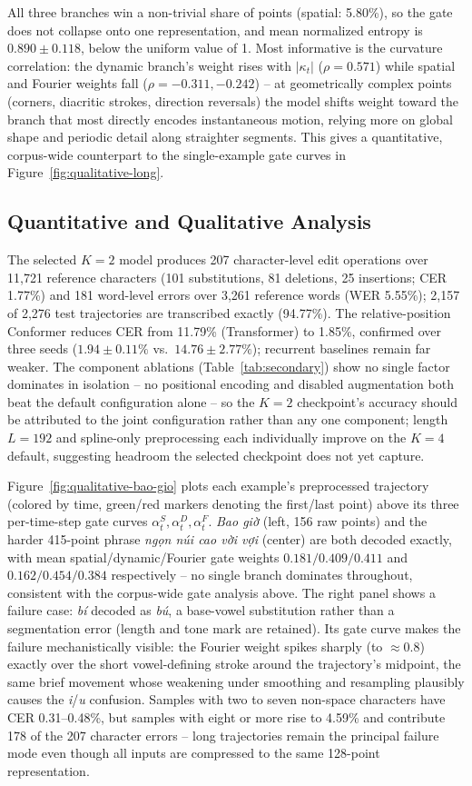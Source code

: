 \documentclass[runningheads]{llncs}
\begin{document}
All three branches win a non-trivial share of points (spatial: 5.80\%), so the gate does not collapse onto one representation, and mean normalized entropy is $0.890\pm0.118$, below the uniform value of 1. Most informative is the curvature correlation: the dynamic branch's weight rises with $|\kappa_t|$ ($\rho=0.571$) while spatial and Fourier weights fall ($\rho=-0.311,-0.242$) -- at geometrically complex points (corners, diacritic strokes, direction reversals) the model shifts weight toward the branch that most directly encodes instantaneous motion, relying more on global shape and periodic detail along straighter segments. This gives a quantitative, corpus-wide counterpart to the single-example gate curves in Figure~\ref{fig:qualitative-long}.

\subsection{Quantitative and Qualitative Analysis}
The selected $K=2$ model produces 207 character-level edit operations over 11,721 reference characters (101 substitutions, 81 deletions, 25 insertions; CER 1.77\%) and 181 word-level errors over 3,261 reference words (WER 5.55\%); 2,157 of 2,276 test trajectories are transcribed exactly (94.77\%). The relative-position Conformer reduces CER from 11.79\% (Transformer) to 1.85\%, confirmed over three seeds ($1.94\pm0.11\%$ vs.\ $14.76\pm2.77\%$); recurrent baselines remain far weaker. The component ablations (Table~\ref{tab:secondary}) show no single factor dominates in isolation -- no positional encoding and disabled augmentation both beat the default configuration alone -- so the $K=2$ checkpoint's accuracy should be attributed to the joint configuration rather than any one component; length $L=192$ and spline-only preprocessing each individually improve on the $K=4$ default, suggesting headroom the selected checkpoint does not yet capture.

Figure~\ref{fig:qualitative-bao-gio} plots each example's preprocessed trajectory (colored by time, green/red markers denoting the first/last point) above its three per-time-step gate curves $\alpha_t^S,\alpha_t^D,\alpha_t^F$. \emph{Bao giờ} (left, 156 raw points) and the harder 415-point phrase \emph{ngọn núi cao vời vợi} (center) are both decoded exactly, with mean spatial/dynamic/Fourier gate weights $0.181/0.409/0.411$ and $0.162/0.454/0.384$ respectively -- no single branch dominates throughout, consistent with the corpus-wide gate analysis above. The right panel shows a failure case: \emph{bí} decoded as \emph{bú}, a base-vowel substitution rather than a segmentation error (length and tone mark are retained). Its gate curve makes the failure mechanistically visible: the Fourier weight spikes sharply (to ${\approx}0.8$) exactly over the short vowel-defining stroke around the trajectory's midpoint, the same brief movement whose weakening under smoothing and resampling plausibly causes the \emph{i}/\emph{u} confusion. Samples with two to seven non-space characters have CER 0.31--0.48\%, but samples with eight or more rise to 4.59\% and contribute 178 of the 207 character errors -- long trajectories remain the principal failure mode even though all inputs are compressed to the same 128-point representation.
\end{document}
